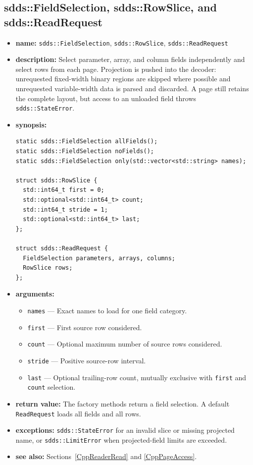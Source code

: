 \documentclass[11pt]{article}
\begin{document}
\subsection{sdds::FieldSelection, sdds::RowSlice, and sdds::ReadRequest}
\label{CppReadRequest}

\begin{itemize}
\item {\bf name:}\newline
{\tt sdds::FieldSelection}, {\tt sdds::RowSlice}, {\tt sdds::ReadRequest}
\item {\bf description:}\newline
Select parameter, array, and column fields independently and select rows from
each page.  Projection is pushed into the decoder: unrequested fixed-width
binary regions are skipped where possible and unrequested variable-width data
is parsed and discarded.  A page still retains the complete layout, but access
to an unloaded field throws {\tt sdds::StateError}.
\item {\bf synopsis:}
\begin{verbatim}
static sdds::FieldSelection allFields();
static sdds::FieldSelection noFields();
static sdds::FieldSelection only(std::vector<std::string> names);

struct sdds::RowSlice {
  std::int64_t first = 0;
  std::optional<std::int64_t> count;
  std::int64_t stride = 1;
  std::optional<std::int64_t> last;
};

struct sdds::ReadRequest {
  FieldSelection parameters, arrays, columns;
  RowSlice rows;
};
\end{verbatim}
\item {\bf arguments:}
\begin{itemize}
\item {\tt names} --- Exact names to load for one field category.
\item {\tt first} --- First source row considered.
\item {\tt count} --- Optional maximum number of source rows considered.
\item {\tt stride} --- Positive source-row interval.
\item {\tt last} --- Optional trailing-row count, mutually exclusive with
{\tt first} and {\tt count} selection.
\end{itemize}
\item {\bf return value:}\newline
The factory methods return a field selection.  A default {\tt ReadRequest}
loads all fields and all rows.
\item {\bf exceptions:}\newline
{\tt sdds::StateError} for an invalid slice or missing projected name, or
{\tt sdds::LimitError} when projected-field limits are exceeded.
\item {\bf see also:}\newline
Sections~\ref{CppReaderRead} and \ref{CppPageAccess}.
\end{itemize}
\end{document}

